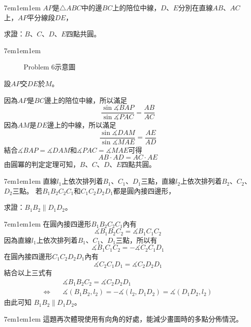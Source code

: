 \documentclass[12pt]{article}
\begin{document}
\begin{mybox}[Problem 6]{7em}{1em}{1em}
    $AP$是$\triangle{ABC}$中的邊$BC$上的陪位中線，$D$、$E$分別在直線$AB$、$AC$上，$AP$平分線段$DE$，

    求證：$B$、$C$、$D$、$E$四點共圓。
\end{mybox}
\begin{mybox}[Answer 6]{7em}{1em}{1em}
    \begin{figure}[H]
        \centering
        \label{fig:p6-1}
        \caption{Problem 6示意圖}
    \end{figure}
    設$AP$交$DE$於$M$。

    因為$AP$是$BC$邊上的陪位中線，所以滿足
    $$
        \frac{\sin{\measuredangle{BAP}}}{\sin{\measuredangle{PAC}}}=\frac{AB}{AC}
    $$
    因為$AM$是$DE$邊上的中線，所以滿足
    $$
        \frac{\sin{\measuredangle{DAM}}}{\sin{\measuredangle{MAE}}}=\frac{AE}{AD}
    $$
    結合$\measuredangle{BAP}=\measuredangle{DAM}$和$\measuredangle{PAC}=\measuredangle{MAE}$可得
    $$
        AB\cdot AD=AC\cdot AE
    $$
    由圓冪的判定定理可知，$B$、$C$、$D$、$E$四點共圓。
\end{mybox}
\begin{mybox}[Problem 7]{7em}{1em}{1em}
    直線$l_1$上依次排列着$B_1$、$C_1$、$D_1$三點，直線$l_2$上依次排列着$B_2$、$C_2$、$D_2$三點。
    若$B_1B_2C_2C_1$和$C_1C_2D_2D_1$都是圓內接四邊形，

    求證：$B_1B_2\parallel D_1D_2$。
\end{mybox}
\begin{mybox}[Answer 7]{7em}{1em}{1em}
    在圓內接四邊形$B_1B_2C_2C_1$內有
    $$
        \measuredangle{B_1B_2C_2}=\measuredangle{B_1C_1C_2}
    $$
    因為直線$l_1$上依次排列着$B_1$、$C_1$、$D_1$三點，所以有
    $$
        \measuredangle{B_1C_1C_2}=-\measuredangle{C_2C_1D_1}
    $$
    在圓內接四邊形$C_1C_2D_2D_1$內有
    $$
        \measuredangle{C_2C_1D_1}=\measuredangle{C_2D_2D_1}
    $$
    結合以上三式有
    \begin{align*}
        &\measuredangle{B_1B_2C_2}=\measuredangle{C_2D_2D_1}\\
        \Leftrightarrow\quad& \measuredangle{\left(B_1B_2,l_2\right)}=-\measuredangle{\left(l_2,D_1D_2\right)}=\measuredangle{\left(D_1D_2,l_2\right)}
    \end{align*}
    由此可知 $B_1B_2\parallel D_1D_2$。
\end{mybox}
\begin{mybox}[Analysis 7]{7em}{1em}{1em}
    這題再次體現使用有向角的好處，能減少畫圖時的多點分佈情況。
\end{mybox}
\end{document}

